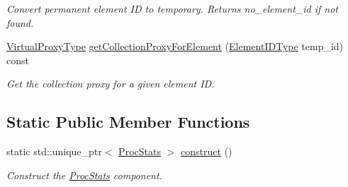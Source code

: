 \begin{DoxyCompactItemize}
\begin{DoxyCompactList}\small\item\em Convert permanent element ID to temporary. Returns {\ttfamily no\+\_\+element\+\_\+id} if not found. \end{DoxyCompactList}\item 
\hyperlink{namespacevt_a1b417dd5d684f045bb58a0ede70045ac}{Virtual\+Proxy\+Type} \hyperlink{structvt_1_1vrt_1_1collection_1_1balance_1_1_proc_stats_a2372ac6c5a73a3a1d198e8db225233d8}{get\+Collection\+Proxy\+For\+Element} (\hyperlink{namespacevt_1_1vrt_1_1collection_1_1balance_a14c8d2c972f2913aa3f1636e5be0a120}{Element\+I\+D\+Type} temp\+\_\+id) const
\begin{DoxyCompactList}\small\item\em Get the collection proxy for a given element ID. \end{DoxyCompactList}\end{DoxyCompactItemize}
\subsection*{Static Public Member Functions}
\begin{DoxyCompactItemize}
\item 
static std\+::unique\+\_\+ptr$<$ \hyperlink{structvt_1_1vrt_1_1collection_1_1balance_1_1_proc_stats}{Proc\+Stats} $>$ \hyperlink{structvt_1_1vrt_1_1collection_1_1balance_1_1_proc_stats_a2589f33e27eee819d91eb2c91816d34b}{construct} ()
\begin{DoxyCompactList}\small\item\em Construct the \hyperlink{structvt_1_1vrt_1_1collection_1_1balance_1_1_proc_stats}{Proc\+Stats} component. \end{DoxyCompactList}\end{DoxyCompactItemize}
